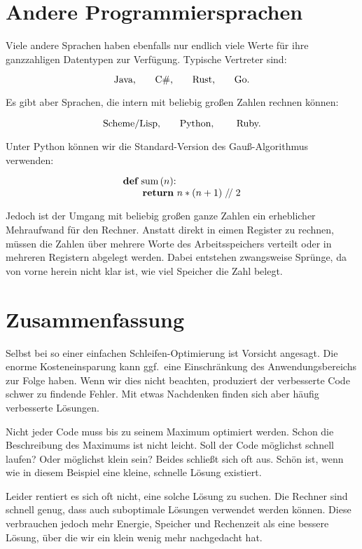 \section{Andere Programmiersprachen}%
%
Viele andere Sprachen haben ebenfalls nur endlich viele Werte für ihre
ganzzahligen Datentypen zur Verfügung.
Typische Vertreter sind:

$$\hbox{Java,\qquad C\#,\qquad Rust,\qquad Go.}$$

\noindent Es gibt aber Sprachen, die intern mit beliebig großen
Zahlen rechnen können:

$$\hbox{Scheme/Lisp,\qquad Python, \qquad Ruby.}$$

\noindent Unter Python können wir die Standard-Version des Gauß-Algorithmus verwenden:

$$\vbox{\halign{#\hfil\cr
{\bf def} sum$\,$($n$):\cr
\qquad {\bf return} $n * (n + 1) \mathrel{/\!/} 2$\cr}}$$

\noindent Jedoch ist der Umgang mit beliebig großen ganze Zahlen
ein erheblicher Mehraufwand für den Rechner.
Anstatt direkt in eimen Register zu rechnen, müssen die
Zahlen über mehrere Worte des Arbeitsspeichers verteilt
oder in mehreren Registern abgelegt werden.
Dabei entstehen zwangsweise Sprünge, da von vorne herein
nicht klar ist, wie viel Speicher die Zahl belegt.

\section{Zusammenfassung}%
%
Selbst bei so einer einfachen Schleifen-Optimierung ist
Vorsicht angesagt.
Die enorme Kosteneinsparung kann ggf.\ eine Einschränkung
des Anwendungsbereichs zur Folge haben.
Wenn wir dies nicht beachten, produziert der verbesserte
Code schwer zu findende Fehler.
Mit etwas Nachdenken finden sich aber häufig verbesserte
Lösungen.

Nicht jeder Code muss bis zu seinem Maximum optimiert
werden.
Schon die Beschreibung des Maximums ist nicht leicht.
Soll der Code möglichst schnell laufen?
Oder möglichst klein sein?
Beides schließt sich oft aus.
Schön ist, wenn wie in diesem Beispiel eine kleine,
schnelle Lösung existiert.

Leider rentiert es sich oft nicht, eine solche Lösung
zu suchen.
Die Rechner sind schnell genug, dass auch suboptimale
Lösungen verwendet werden können.
Diese verbrauchen jedoch mehr Energie, Speicher und
Rechenzeit als eine bessere Lösung, über die wir ein
klein wenig mehr nachgedacht hat.

